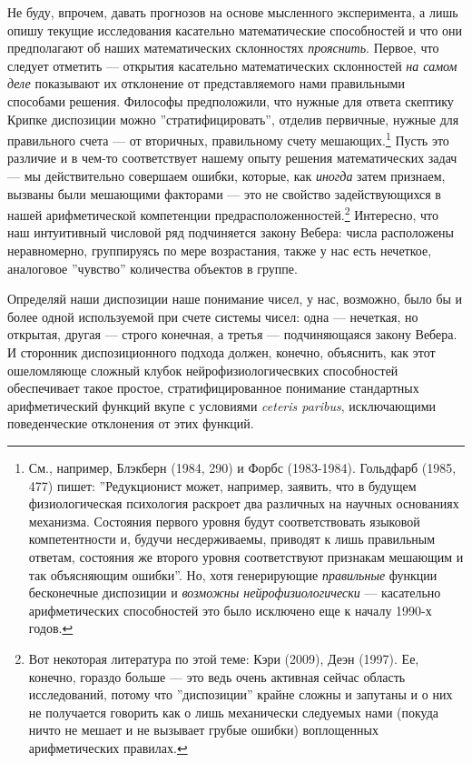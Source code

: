 \documentclass[11pt]{book}
\begin{document}
Не буду, впрочем, давать прогнозов на основе мысленного эксперимента, а лишь опишу текущие исследования касательно математические способностей и что они предполагают об наших математических склонностях \textit{прояснить}. Первое, что следует отметить --- открытия касательно математических склонностей \textit{на самом деле} показывают их отклонение от представляемого нами правильными способами решения. Философы предположили, что нужные для ответа скептику Крипке диспозиции можно ''стратифицировать'', отделив первичные, нужные для правильного счета --- от вторичных, правильному счету мешающих.\footnote{См., например, Блэкберн (1984, 290) и Форбс (1983-1984). Гольдфарб (1985, 477) пишет: ''Редукционист может, например, заявить, что в будущем физиологическая психология раскроет два различных на научных основаниях механизма. Состояния первого уровня будут соответствовать языковой компетентности и, будучи несдерживаемы, приводят к лишь правильным ответам, состояния же второго уровня соответствуют признакам мешающим и так объясняющим ошибки''. Но, хотя генерирующие \textit{правильные} функции бесконечные диспозиции и \textit{возможны нейрофизиологически} --- касательно арифметических способностей это было исключено еще к началу 1990-х годов.} Пусть это различие и в чем-то соответствует нашему опыту решения математических задач --- мы действительно совершаем ошибки, которые, как \textit{иногда} затем признаем, вызваны были мешающими факторами --- это не свойство задействующихся в нашей арифметической компетенции предрасположенностей.\footnote{Вот некоторая литература по этой теме: Кэри (2009), Деэн (1997). Ее, конечно, гораздо больше --- это ведь очень активная сейчас область исследований, потому что ''диспозиции'' крайне сложны и запутаны и о них не получается говорить как о лишь механически следуемых нами (покуда ничто не мешает и не вызывает грубые ошибки) воплощенных арифметических правилах.} Интересно, что наш интуитивный числовой ряд подчиняется закону Вебера: числа расположены неравномерно, группируясь по мере возрастания, также у нас есть нечеткое, аналоговое ''чувство'' количества объектов в группе.

Определяй наши диспозиции наше понимание чисел, у нас, возможно, было бы и более одной используемой при счете системы чисел: одна --- нечеткая, но открытая, другая --- строго конечная, а третья --- подчиняющаяся закону Вебера. И сторонник диспозиционного подхода должен, конечно, объяснить, как этот ошеломляюще сложный клубок нейрофизиологичесвких способностей обеспечивает такое простое, стратифицированное понимание стандартных арифметический функций вкупе с условиями \textit{ceteris paribus}, исключающими поведенческие отклонения от этих функций.
\end{document}
